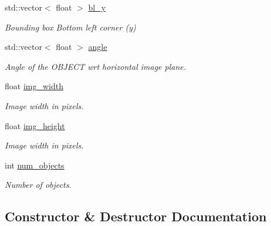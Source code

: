 \begin{DoxyCompactItemize}
\mbox{\label{classMsg_a58c75ea7de8f441e0054384b3be240be}} 
std\+::vector$<$ float $>$ \hyperlink{classMsg_a58c75ea7de8f441e0054384b3be240be}{bl\+\_\+y}
\begin{DoxyCompactList}\small\item\em Bounding box Bottom left corner (y) \end{DoxyCompactList}\item 
\mbox{\label{classMsg_a227bf9a23dd1cfe4ba4fa4ce4bc87dd0}} 
std\+::vector$<$ float $>$ \hyperlink{classMsg_a227bf9a23dd1cfe4ba4fa4ce4bc87dd0}{angle}
\begin{DoxyCompactList}\small\item\em Angle of the O\+B\+J\+E\+CT wrt horizontal image plane. \end{DoxyCompactList}\item 
\mbox{\label{classMsg_a9a8786632db452e94da643b3289226ad}} 
float \hyperlink{classMsg_a9a8786632db452e94da643b3289226ad}{img\+\_\+width}
\begin{DoxyCompactList}\small\item\em Image width in pixels. \end{DoxyCompactList}\item 
\mbox{\label{classMsg_af095e04f7257b4246c56276925fc5b35}} 
float \hyperlink{classMsg_af095e04f7257b4246c56276925fc5b35}{img\+\_\+height}
\begin{DoxyCompactList}\small\item\em Image width in pixels. \end{DoxyCompactList}\item 
\mbox{\label{classMsg_ac0ca8cef6654423a02d602b8bcc8ccad}} 
int \hyperlink{classMsg_ac0ca8cef6654423a02d602b8bcc8ccad}{num\+\_\+objects}
\begin{DoxyCompactList}\small\item\em Number of objects. \end{DoxyCompactList}\end{DoxyCompactItemize}


\subsection{Constructor \& Destructor Documentation}
\mbox{\label{classMsg_adccb11ca415299593832ae88cf1472b0}} 
